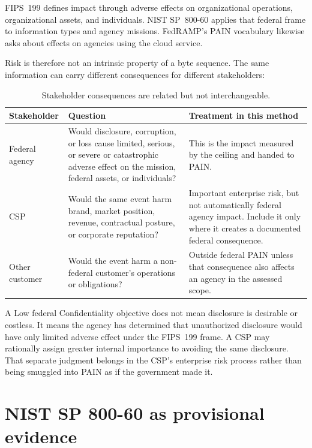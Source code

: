 \documentclass[11pt]{article}
\begin{document}
FIPS~199 defines impact through adverse effects on organizational operations,
organizational assets, and individuals. NIST SP~800-60 applies that federal frame
to information types and agency missions. FedRAMP's PAIN vocabulary likewise asks
about effects on agencies using the cloud service.

Risk is therefore not an intrinsic property of a byte sequence. The same
information can carry different consequences for different stakeholders:

\begin{table}[H]
\centering
\small
\renewcommand{\arraystretch}{1.2}
\begin{tabularx}{\textwidth}{@{}P{0.21\textwidth}YY@{}}
\toprule
\textbf{Stakeholder} & \textbf{Question} & \textbf{Treatment in this method} \\
\midrule
Federal agency &
Would disclosure, corruption, or loss cause limited, serious, or severe or
catastrophic adverse effect on the mission, federal assets, or individuals? &
This is the impact measured by the ceiling and handed to PAIN. \\
CSP &
Would the same event harm brand, market position, revenue, contractual posture, or
corporate reputation? &
Important enterprise risk, but not automatically federal agency impact. Include it
only where it creates a documented federal consequence. \\
Other customer &
Would the event harm a non-federal customer's operations or obligations? &
Outside federal PAIN unless that consequence also affects an agency in the assessed
scope. \\
\bottomrule
\end{tabularx}
\caption{Stakeholder consequences are related but not interchangeable.}
\end{table}

A Low federal Confidentiality objective does not mean disclosure is desirable or
costless. It means the agency has determined that unauthorized disclosure would
have only limited adverse effect under the FIPS~199 frame. A CSP may rationally
assign greater internal importance to avoiding the same disclosure. That separate
judgment belongs in the CSP's enterprise risk process rather than being smuggled
into PAIN as if the government made it.

\section{NIST SP 800-60 as provisional evidence}
\end{document}
